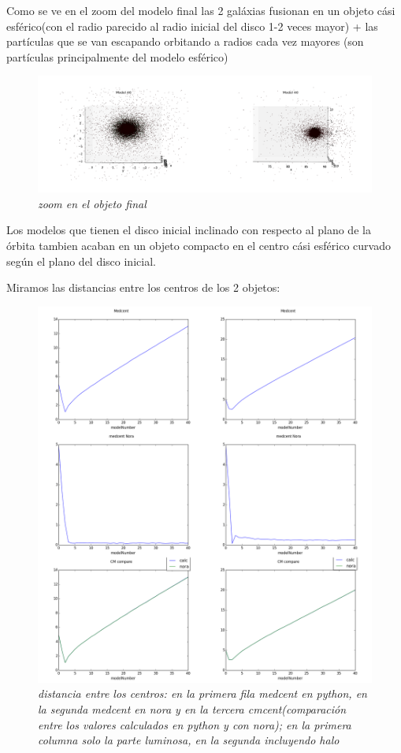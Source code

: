 \documentclass[12pt]{article} %
\renewcommand{\=}[1]{\stackrel{#1}{=}} %
\theoremstyle{definition}
\theoremstyle{remark}
\begin{document}
Como se ve en el zoom del modelo final las 2 galáxias fusionan en un objeto cási esférico(con el radio parecido al radio inicial del disco 1-2 veces mayor) + las partículas que se van escapando orbitando a radios cada vez mayores (son partículas principalmente del modelo esférico)
\begin{figure}[!ht]
 \centering
 \includegraphics[scale=0.2]{finzoomsep590deg.png}
 \caption{\emph{zoom en el objeto final}}
\end{figure}

Los modelos que tienen el disco inicial inclinado con respecto al plano de la órbita tambien acaban en un objeto compacto en el centro
 cási esférico curvado según el plano del disco inicial.

Miramos las distancias entre los centros de los 2 objetos:

\begin{figure}[!ht]
 \centering
 \includegraphics[scale=0.2]{sep5Centerdist.png}
 \caption{\emph{ distancia entre los centros: en la primera fila medcent en python, en la  segunda  medcent en nora y en la tercera cmcent(comparación entre los valores calculados en python y con nora); en la primera columna solo la parte luminosa, en la segunda incluyendo halo }}
\end{figure}
\end{document}
